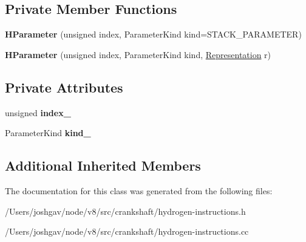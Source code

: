\subsection*{Private Member Functions}
\begin{DoxyCompactItemize}
\item 
{\bfseries H\+Parameter} (unsigned index, Parameter\+Kind kind=S\+T\+A\+C\+K\+\_\+\+P\+A\+R\+A\+M\+E\+T\+ER)\hypertarget{classv8_1_1internal_1_1_h_parameter_a2c4da8aa3d55d9f407a451cb3bf05faa}{}\label{classv8_1_1internal_1_1_h_parameter_a2c4da8aa3d55d9f407a451cb3bf05faa}

\item 
{\bfseries H\+Parameter} (unsigned index, Parameter\+Kind kind, \hyperlink{classv8_1_1internal_1_1_representation}{Representation} r)\hypertarget{classv8_1_1internal_1_1_h_parameter_a5cd7d21c3ae4e20fd6388715d0e3636e}{}\label{classv8_1_1internal_1_1_h_parameter_a5cd7d21c3ae4e20fd6388715d0e3636e}

\end{DoxyCompactItemize}
\subsection*{Private Attributes}
\begin{DoxyCompactItemize}
\item 
unsigned {\bfseries index\+\_\+}\hypertarget{classv8_1_1internal_1_1_h_parameter_a797eac64e052452208bde1bd4de7c976}{}\label{classv8_1_1internal_1_1_h_parameter_a797eac64e052452208bde1bd4de7c976}

\item 
Parameter\+Kind {\bfseries kind\+\_\+}\hypertarget{classv8_1_1internal_1_1_h_parameter_ae187f8406fef1f4e52139928c1e9a573}{}\label{classv8_1_1internal_1_1_h_parameter_ae187f8406fef1f4e52139928c1e9a573}

\end{DoxyCompactItemize}
\subsection*{Additional Inherited Members}


The documentation for this class was generated from the following files\+:\begin{DoxyCompactItemize}
\item 
/\+Users/joshgav/node/v8/src/crankshaft/hydrogen-\/instructions.\+h\item 
/\+Users/joshgav/node/v8/src/crankshaft/hydrogen-\/instructions.\+cc\end{DoxyCompactItemize}
